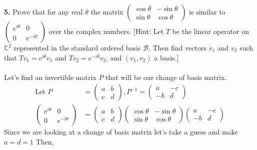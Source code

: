 \documentclass[11pt]{amsart}
\theoremstyle{definition}  %
\newcommand{\C}{\mathbb{C}}
\begin{document}
\newpage
\vskip 0.1cm
\noindent
{\bf 5.} Prove that for any real $\theta$ the matrix $\left( \begin{array}{cr} \cos \theta & -\sin \theta \\ \sin \theta & \cos \theta \end{array} \right)$
is similar to $\left( \begin{array}{cc} e^{i\theta}  & 0 \\ 0 & e^{-i\theta} \end{array} \right)$ over the complex numbers. [Hint: Let $T$ be the linear
operator on $\C^2$ represented in the standard ordered basis $\mathcal{B}$. Then find vectors $v_1$ and $v_2$ such that
$Tv_1 = e^{i\theta} v_1$ and $Tv_2 = e^{-i\theta} v_2$, and $(v_1, v_2)$ a basis.]\\
\\
Let's find an invertible matrix $P$ that will be our change of basis matrix.
\begin{align*}
	\text{Let } P &= \left(\begin{array}{cr}
		a & b\\
		c & d
	\end{array}\right), P^{-1}=\left(\begin{array}{cr}
		a &	-c \\
		-b & d
	\end{array}\right)\\
	\left(\begin{array}{cr}
		e^{i\theta} & 0\\
		0 & e^{-i\theta} 
	\end{array}\right) &=
	\left(\begin{array}{cr}
		a & b\\
		c & d
	\end{array}\right)
	\left( \begin{array}{cr} \cos \theta & -\sin \theta \\ \sin \theta & \cos \theta \end{array} \right)
	\left(\begin{array}{cr}
		a &	-c \\
		-b & d
	\end{array}\right)
\end{align*}Since we are looking at a change of basis matrix let's take a guess and make $a=d=1$ Then,
\end{document}
